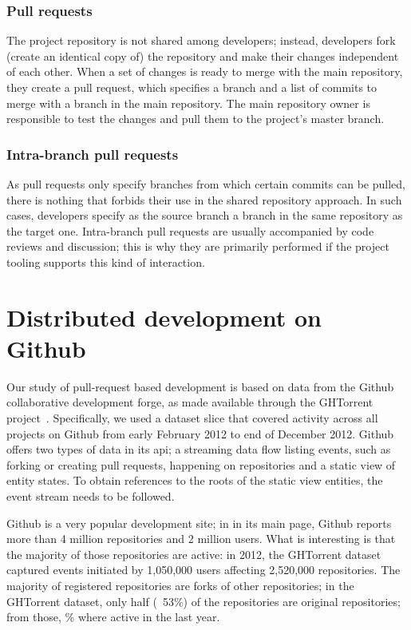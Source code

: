 \documentclass{sig-alternate}
\begin{document}
\subsubsection{Pull requests} The project repository is not shared among
developers; instead, developers fork (create an identical copy of) the
repository and make their changes independent of each other. When a set of
changes is ready to merge with the main repository, they create a pull request,
which specifies a branch and a list of commits to merge with a branch in the
main repository. The main repository owner is responsible to test the changes
and pull them to the project's master branch. 

\subsubsection{Intra-branch pull requests} As pull requests only specify branches
from which certain commits can be pulled, there is nothing that forbids their
use in the shared repository approach. In such cases, developers specify as the
source branch a branch in the same repository as the target one. Intra-branch
pull requests are usually accompanied by code reviews and discussion; this is
why they are primarily performed if the project tooling supports this kind of
interaction.

\section{Distributed development on Github}

Our study of pull-request based development is based on data from the Github
collaborative development forge, as made available through the GHTorrent
project~\cite{GS12}. Specifically, we used a dataset slice that covered activity
across all projects on Github from early February 2012 to end of December 2012.
Github offers two types of data in its {\sc api}; a streaming data flow listing
events, such as forking or creating pull requests, happening on repositories and
a static view of entity states. To obtain references to the roots of the static
view entities, the event stream needs to be followed.

Github is a very popular development site;
in in its main page, Github reports more than 4 million repositories and 2 
million users. What is interesting is that the majority of those repositories are
active: in 2012, the GHTorrent dataset captured events initiated by  
1,050,000 users affecting 
2,520,000 repositories. 
The majority of registered repositories are forks of other 
repositories; in the GHTorrent dataset, only half
(~53\%) of the repositories are original repositories;
from those, \% where active in the last year.
\end{document}
